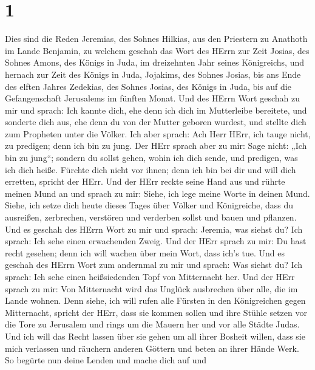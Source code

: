 \hypertarget{section}{%
\section{1}\label{section}}

 Dies sind die Reden Jeremias, des Sohnes Hilkias, aus den
Priestern zu Anathoth im Lande Benjamin,  zu welchem geschah
das Wort des HErrn zur Zeit Josias, des Sohnes Amons, des Königs in
Juda, im dreizehnten Jahr seines Königreichs,  und hernach
zur Zeit des Königs in Juda, Jojakims, des Sohnes Josias, bis ans Ende
des elften Jahres Zedekias, des Sohnes Josias, des Königs in Juda, bis
auf die Gefangenschaft Jerusalems im fünften Monat.  Und des
HErrn Wort geschah zu mir und sprach:  Ich kannte dich, ehe
denn ich dich im Mutterleibe bereitete, und sonderte dich aus, ehe denn
du von der Mutter geboren wurdest, und stellte dich zum Propheten unter
die Völker.  Ich aber sprach: Ach Herr HErr, ich tauge
nicht, zu predigen; denn ich bin zu jung.  Der HErr sprach
aber zu mir: Sage nicht: „Ich bin zu jung``; sondern du sollst gehen,
wohin ich dich sende, und predigen, was ich dich heiße. 
Fürchte dich nicht vor ihnen; denn ich bin bei dir und will dich
erretten, spricht der HErr.  Und der HErr reckte seine Hand
aus und rührte meinen Mund an und sprach zu mir: Siehe, ich lege meine
Worte in deinen Mund.  Siehe, ich setze dich heute dieses
Tages über Völker und Königreiche, dass du ausreißen, zerbrechen,
verstören und verderben sollst und bauen und pflanzen.  Und
es geschah des HErrn Wort zu mir und sprach: Jeremia, was siehst du? Ich
sprach: Ich sehe einen erwachenden Zweig.  Und der HErr
sprach zu mir: Du hast recht gesehen; denn ich will wachen über mein
Wort, dass ich's tue.  Und es geschah des HErrn Wort zum
andernmal zu mir und sprach: Was siehst du? Ich sprach: Ich sehe einen
heißsiedenden Topf von Mitternacht her.  Und der HErr
sprach zu mir: Von Mitternacht wird das Unglück ausbrechen über alle,
die im Lande wohnen.  Denn siehe, ich will rufen alle
Fürsten in den Königreichen gegen Mitternacht, spricht der HErr, dass
sie kommen sollen und ihre Stühle setzen vor die Tore zu Jerusalem und
rings um die Mauern her und vor alle Städte Judas.  Und ich
will das Recht lassen über sie gehen um all ihrer Bosheit willen, dass
sie mich verlassen und räuchern anderen Göttern und beten an ihrer Hände
Werk.  So begürte nun deine Lenden und mache dich auf und
